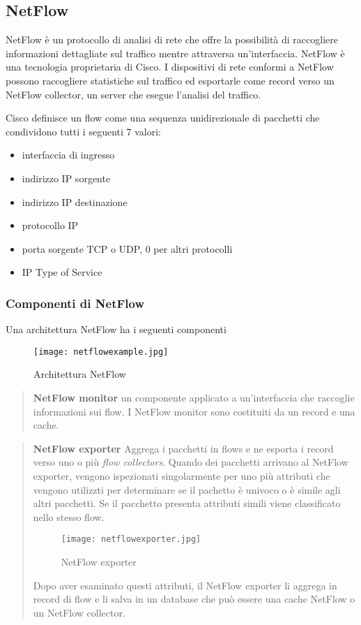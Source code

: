 \documentclass[../main.tex]{subfiles}
\begin{document}
\subsection{NetFlow}
NetFlow è un protocollo di analisi di rete che offre la possibilità di raccogliere informazioni dettagliate sul traffico mentre attraversa un'interfaccia. NetFlow è una tecnologia proprietaria di Cisco. I dispositivi di rete conformi a NetFlow possono raccogliere statistiche sul traffico ed esportarle come record verso un NetFlow collector, un server che esegue l'analisi del traffico.

Cisco definisce un flow come una sequenza unidirezionale di pacchetti che condividono tutti i seguenti 7 valori:

\begin{itemize}
				\item interfaccia di ingresso
				\item indirizzo IP sorgente
				\item indirizzo IP destinazione
				\item protocollo IP
				\item porta sorgente TCP o UDP, 0 per altri protocolli
				\item IP Type of Service
\end{itemize}

\subsubsection{Componenti di NetFlow}
Una architettura NetFlow ha i seguenti componenti

\begin{figure}[H]
\centering
\texttt{[image: netflowexample.jpg]}
\caption{Architettura NetFlow}
\end{figure}

\begin{verse}
\textbf{NetFlow monitor}
un componente applicato a un'interfaccia che raccoglie informazioni sui flow. I NetFlow monitor sono costituiti da un record e una cache.
\end{verse}

\begin{verse}
\textbf{NetFlow exporter}
Aggrega i pacchetti in flows e ne esporta i record verso uno o più \textit{flow collectors}.
Quando dei pacchetti arrivano al NetFlow exporter, vengono ispezionati singolarmente per uno più attributi che vengono utilizzti per determinare se il pachetto è univoco o è simile agli altri pacchetti. Se il pacchetto presenta attributi simili viene classificato nello stesso flow.

\begin{figure}[H]
\centering
\texttt{[image: netflowexporter.jpg]}
\caption{NetFlow exporter}
\end{figure}

Dopo aver esaminato questi attributi, il NetFlow exporter li aggrega in record di flow e li salva in un database che può essere una cache NetFlow o un NetFlow collector.
\end{verse}
\end{document}
